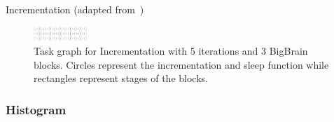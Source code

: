 \documentclass[conference]{IEEEtran}
\begin{document}
\begin{algorithm}[!b]
    \caption{Incrementation (adapted from~\cite{hayot2019performance})}\label{alg:incrementation}
    \begin{algorithmic}
        \EndFor
    \EndFor
\end{algorithmic}
\end{algorithm}

\begin{figure}[!b]
    \centering
    \includegraphics[width=2cm, height=\columnwidth,
    angle=-90]{images/incrementation-task-graph.png}
    \caption{Task graph for Incrementation with 5 iterations and 3 BigBrain blocks.
    Circles represent the incrementation and sleep function while rectangles
    represent stages of the blocks.}\label{fig:tg-inc}
\end{figure}

\subsubsection{Histogram}
\end{document}
